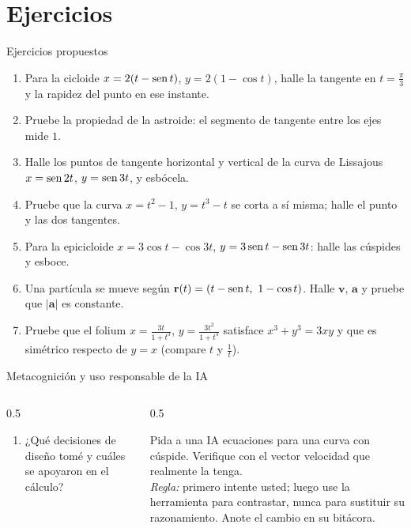 \documentclass[10pt,aspectratio=169]{beamer}
\begin{document}
\section{Ejercicios}

\begin{frame}{Ejercicios propuestos}
  \small
  \begin{ejercicio}
    \begin{enumerate}
      \item Para la cicloide $x=2(t-\operatorname{sen} t)$, $y=2(1-\cos t)$, halle la tangente en $t=\frac\pi3$ y la rapidez del punto en ese instante.
      \item Pruebe la propiedad de la astroide: el segmento de tangente entre los ejes mide $1$.
      \item Halle los puntos de tangente horizontal y vertical de la curva de Lissajous $x=\operatorname{sen}2t$, $y=\operatorname{sen}3t$, y esbócela.
      \item Pruebe que la curva $x=t^2-1$, $y=t^3-t$ se corta a sí misma; halle el punto y las dos tangentes.
      \item Para la epicicloide $x=3\cos t-\cos3t$, $y=3\operatorname{sen} t-\operatorname{sen}3t$: halle las cúspides y esboce.
      \item Una partícula se mueve según $\mathbf r(t)=(t-\operatorname{sen} t,\ 1-\cos t)$. Halle $\mathbf v$, $\mathbf a$ y pruebe que $|\mathbf a|$ es constante.
      \item Pruebe que el folium $x=\frac{3t}{1+t^3}$, $y=\frac{3t^2}{1+t^3}$ satisface $x^3+y^3=3xy$ y que es simétrico respecto de $y=x$
        (compare $t$ y $\frac1t$).
    \end{enumerate}
  \end{ejercicio}
\end{frame}

\begin{frame}{Metacognición y uso responsable de la IA}
  \small
  \begin{columns}[t]
    \begin{column}{0.5\textwidth}
      \begin{metacog}
        \begin{enumerate}
          \metacomun
          \item ¿Qué decisiones de diseño tomé y cuáles se apoyaron en el cálculo?
        \end{enumerate}
      \end{metacog}
    \end{column}
    \begin{column}{0.5\textwidth}
      \begin{iabox}
        Pida a una IA ecuaciones para una curva con cúspide. Verifique con el vector velocidad que realmente la tenga.\\[2pt]
        \textit{Regla:} primero intente usted; luego use la herramienta para contrastar, nunca para sustituir su razonamiento. Anote el cambio en su bitácora.
      \end{iabox}
    \end{column}
  \end{columns}
\end{frame}
\end{document}
